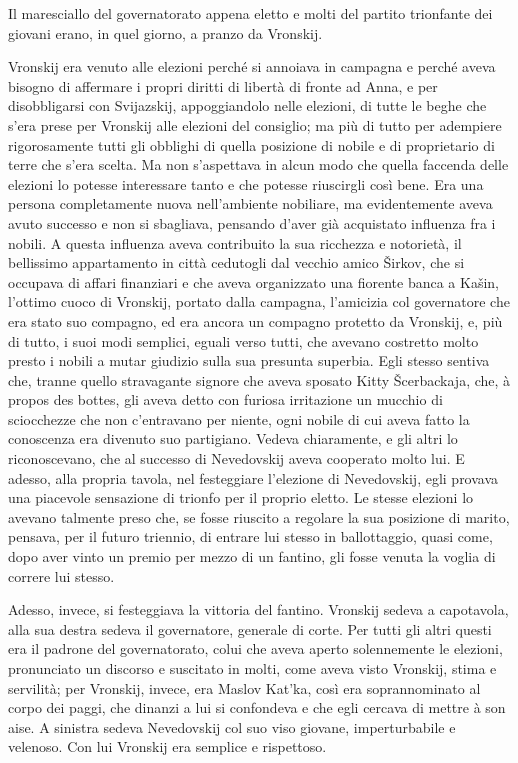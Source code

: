 Il maresciallo del governatorato appena eletto e molti del partito trionfante dei giovani erano, in quel giorno, a pranzo da Vronskij. 

Vronskij era venuto alle elezioni perché si annoiava in campagna e perché aveva bisogno di affermare i propri diritti di libertà di fronte ad Anna, e per disobbligarsi con Svijazskij, appoggiandolo nelle elezioni, di tutte le beghe che s'era prese per Vronskij alle elezioni del consiglio; ma più di tutto per adempiere rigorosamente tutti gli obblighi di quella posizione di nobile e di proprietario di terre che s'era scelta. Ma non s'aspettava in alcun modo che quella faccenda delle elezioni lo potesse interessare tanto e che potesse riuscirgli così bene. Era una persona completamente nuova nell'ambiente nobiliare, ma evidentemente aveva avuto successo e non si sbagliava, pensando d'aver già acquistato influenza fra i nobili. A questa influenza aveva contribuito la sua ricchezza e notorietà, il bellissimo appartamento in città cedutogli dal vecchio amico Širkov, che si occupava di affari finanziari e che aveva organizzato una fiorente banca a Kašin, l'ottimo cuoco di Vronskij, portato dalla campagna, l'amicizia col governatore che era stato suo compagno, ed era ancora un compagno protetto da Vronskij, e, più di tutto, i suoi modi semplici, eguali verso tutti, che avevano costretto molto presto i nobili a mutar giudizio sulla sua presunta superbia. Egli stesso sentiva che, tranne quello stravagante signore che aveva sposato Kitty Šcerbackaja, che, à propos des bottes, gli aveva detto con furiosa irritazione un mucchio di sciocchezze che non c'entravano per niente, ogni nobile di cui aveva fatto la conoscenza era divenuto suo partigiano. Vedeva chiaramente, e gli altri lo riconoscevano, che al successo di Nevedovskij aveva cooperato molto lui. E adesso, alla propria tavola, nel festeggiare l'elezione di Nevedovskij, egli provava una piacevole sensazione di trionfo per il proprio eletto. Le stesse elezioni lo avevano talmente preso che, se fosse riuscito a regolare la sua posizione di marito, pensava, per il futuro triennio, di entrare lui stesso in ballottaggio, quasi come, dopo aver vinto un premio per mezzo di un fantino, gli fosse venuta la voglia di correre lui stesso. 

Adesso, invece, si festeggiava la vittoria del fantino. Vronskij sedeva a capotavola, alla sua destra sedeva il governatore, generale di corte. Per tutti gli altri questi era il padrone del governatorato, colui che aveva aperto solennemente le elezioni, pronunciato un discorso e suscitato in molti, come aveva visto Vronskij, stima e servilità; per Vronskij, invece, era Maslov Kat'ka, così era soprannominato al corpo dei paggi, che dinanzi a lui si confondeva e che egli cercava di mettre à son aise. A sinistra sedeva Nevedovskij col suo viso giovane, imperturbabile e velenoso. Con lui Vronskij era semplice e rispettoso. 

